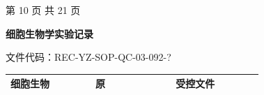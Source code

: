 \documentclass[UTF8,10pt,a4paper,fontset=fandol]{ctexart}
\begin{document}
\vspace{0.5em}
\begin{center}
第 10 页 共 21 页
\end{center}

\newpage

\begin{center}
\textbf{细胞生物学实验记录}
\end{center}

\noindent
文件代码：REC-YZ-SOP-QC-03-092-? \hfill
\begin{tabular}{|p{0.18\linewidth}|p{0.18\linewidth}|p{0.18\linewidth}|p{0.18\linewidth}|}
\hline
细胞生物 & \multicolumn{1}{c|}{原} & \multicolumn{2}{c|}{受控文件}\\
\hline
\end{tabular}

\vspace{2mm}
\end{document}
